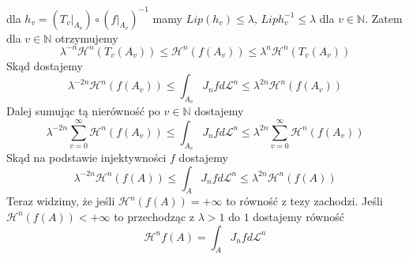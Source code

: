 \begin{tw}
	dla $h_v = (T_v|_{A_v}) \circ (f|_{A_v})^{-1}$ mamy $Lip(h_v) \leq \lambda$, $Lip h_v^{-1} \leq \lambda$ dla $v \in \mathbb{N}$. Zatem dla $v \in \mathbb{N}$ otrzymujemy $$
		\lambda^{-n} \mathcal{H}^n(T_v(A_v)) \leq \mathcal{H}^n(f(A_v)) \leq \lambda^n \mathcal{H}^n(T_v(A_v))
	$$
	Skąd dostajemy $$
		\lambda^{-2n}\mathcal{H}^n(f(A_v)) \leq \int_{A_v}J_nf d \mathcal{L}^n \leq \lambda^{2n} \mathcal{H}^n(f(A_v))
	$$
	Dalej sumując tą nierówność po $v \in \mathbb{N}$ dostajemy $$
		\lambda^{-2n} \sum_{v=0}^{\infty} \mathcal{H}^n(f(A_v)) \leq \int_{A_v}J_nf d \mathcal{L}^n \leq \lambda^{2n} \sum_{v=0}^{\infty} \mathcal{H}^n(f(A_v))
	$$
	Skąd na podstawie injektywności $f$ dostajemy $$
		\lambda^{-2n}\mathcal{H}^n(f(A)) \leq \int_{A}J_nf d \mathcal{L}^n \leq \lambda^{2n} \mathcal{H}^n(f(A))
	$$
	Teraz widzimy, że jeśli $\mathcal{H}^n(f(A)) = +\infty$ to równość z tezy zachodzi. Jeśli $\mathcal{H}^n(f(A)) < +\infty$ to przechodząc z $\lambda > 1$ do $1$ dostajemy równość $$
		\mathcal{H}^n{f(A)} = \int_A J_nf d\mathcal{L}^n
	$$
\end{tw}